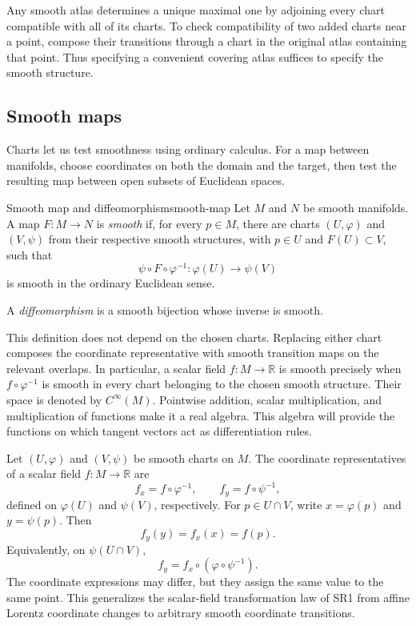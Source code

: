 \documentclass[11pt,a4paper]{article}
\numberwithin{equation}{section}
\newcommand{\R}{\mathbb R}
\newcommand{\Cinf}{C^\infty}
\begin{document}
Any smooth atlas determines a unique maximal one by adjoining every
chart compatible with all of its charts. To check compatibility of
two added charts near a point, compose their transitions through a
chart in the original atlas containing that point. Thus specifying
a convenient covering atlas suffices to specify the smooth structure.

\subsection{Smooth maps}

Charts let us test smoothness using ordinary calculus. For a map between
manifolds, choose coordinates on both the domain and the target, then
test the resulting map between open subsets of Euclidean spaces.

\begin{definition}{Smooth map and diffeomorphism}{smooth-map}
Let \(M\) and \(N\) be smooth manifolds. A map \(F:M\to N\) is
\emph{smooth} if, for every \(p\in M\), there are charts
\((U,\varphi)\) and \((V,\psi)\) from their respective smooth
structures, with \(p\in U\) and \(F(U)\subset V\), such that
\[
 \psi\circ F\circ\varphi^{-1}:
 \varphi(U)\longrightarrow\psi(V)
\]
is smooth in the ordinary Euclidean sense.

A \emph{diffeomorphism} is a smooth bijection whose inverse is smooth.
\end{definition}

This definition does not depend on the chosen charts. Replacing either
chart composes the coordinate representative with smooth transition
maps on the relevant overlaps. In particular, a scalar field
\(f:M\to\R\) is smooth precisely when \(f\circ\varphi^{-1}\) is smooth
in every chart belonging to the chosen smooth structure. Their space
is denoted by \(\Cinf(M)\). Pointwise addition, scalar multiplication,
and multiplication of functions make it a real algebra. This algebra
will provide the functions on which tangent vectors act as differentiation
rules.

Let \((U,\varphi)\) and \((V,\psi)\) be smooth charts on \(M\).
The coordinate representatives of a scalar field \(f:M\to\R\) are
\[
 f_x=f\circ\varphi^{-1},
 \qquad
 f_y=f\circ\psi^{-1},
\]
defined on \(\varphi(U)\) and \(\psi(V)\), respectively. For
\(p\in U\cap V\), write \(x=\varphi(p)\) and \(y=\psi(p)\). Then
\[
 f_y(y)=f_x(x)=f(p).
\]
Equivalently, on \(\psi(U\cap V)\),
\[
 f_y=f_x\circ(\varphi\circ\psi^{-1}).
\]
The coordinate expressions may differ, but they assign the same
value to the same point. This generalizes the scalar-field
transformation law of SR1 from affine Lorentz coordinate changes
to arbitrary smooth coordinate transitions.
\end{document}
